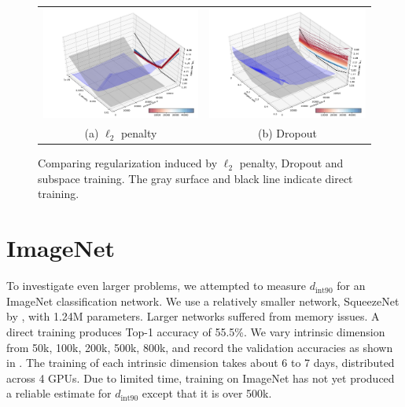 \documentclass{article} %
\newcommand{\dintn}{d_{\mathrm{int90}}}
\begin{document}
\begin{figure}
  \centering
	\vspace{-0mm}
	\begin{tabular}{c c}
		\hspace{-9mm}
		\includegraphics[width=7.4cm]{fnn_cifar_l2_reg/fnn_cifar_l2_reg_ability} &
		\hspace{-7mm}
		\includegraphics[width=7.4cm]{fnn_cifar_dropout_reg/fnn_cifar_dropout_reg_ability}
		\\
		(a) $\ell_2$ penalty & 	(b) Dropout   %
	\end{tabular} \vspace{-2mm}
	\caption{Comparing regularization induced by $\ell_2$ penalty, Dropout and subspace training. The gray surface and black line indicate direct training.}
	\label{fig:fnn_cifar_reg}
	\vspace{-3mm}
\end{figure}



\section{ImageNet}

To investigate even larger problems, we attempted to measure $\dintn$ for an ImageNet classification network. We
use a relatively smaller network, SqueezeNet by \cite{iandola2016squeezenet}, with 1.24M parameters. Larger networks suffered from memory issues.
A direct training produces Top-1 accuracy of 55.5\%. We vary intrinsic dimension from {50k, 100k, 200k, 500k, 800k}, and record the validation accuracies as shown in . The training of each intrinsic dimension takes about 6 to 7 days, distributed across 4 GPUs.
Due to limited time, training on ImageNet has not yet produced a reliable estimate for $\dintn$ except that it is over 500k.
\end{document}
